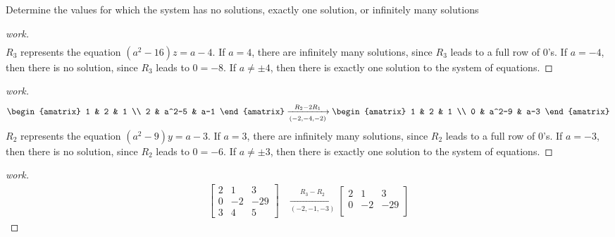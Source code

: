 \begin{question}{1.2}{Determine the values for which the system has no solutions, exactly one solution, or infinitely many solutions}
\begin{proof}[work]
\begin{align*}
    \end{align*}
    $R_3$ represents the equation $(a^2-16)z = a-4$. If $a = 4$, there are infinitely many solutions, since $R_3$ leads to a full row of $0$'s. If $a = -4$, then there is no solution, since $R_3$ leads to $0 = -8$. If $a \neq \pm 4$, then there is exactly one solution to the system of equations.
  \end{proof}
  \begin{proof}[work]
    \begin{align*}
      \begin{amatrix}{2}
        1 & 2     & 1 \\
        2 & a^2-5 & a-1
      \end{amatrix} \xrightarrow[(-2,-4,-2)]{R_2 - 2R_1}
      \begin{amatrix}{2}
        1 & 2     & 1 \\
        0 & a^2-9 & a-3
      \end{amatrix}
    \end{align*}
    $R_2$ represents the equation $(a^2-9)y = a-3$. If $a = 3$, there are infinitely many solutions, since $R_2$ leads to a full row of $0$'s. If $a = -3$, then there is no solution, since $R_2$ leads to $0 = -6$. If $a \neq \pm 3$, then there is exactly one solution to the system of equations.
  \end{proof}
  \begin{proof}[work]
    \begin{align*}
      \begin{bmatrix}
        2 & 1  & 3   \\
        0 & -2 & -29 \\
        3 & 4  & 5
      \end{bmatrix} & \xrightarrow[(-2,-1,-3)]{R_3 - R_2}
      \begin{bmatrix}
        2 & 1  & 3   \\
        0 & -2 & -29 \\

\end{bmatrix}
\end{align*}
\end{proof}
\end{question}

